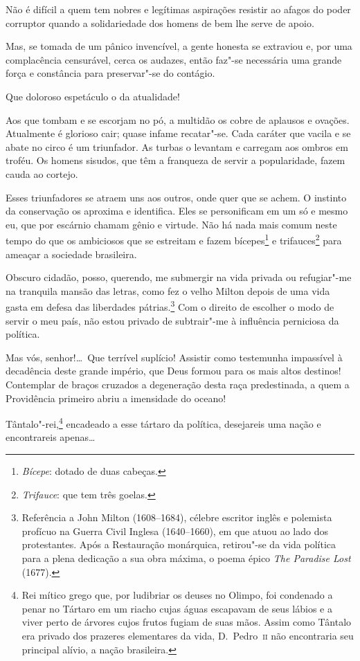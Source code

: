  Não é difícil a quem tem nobres e legítimas aspirações resistir ao
afagos do poder corruptor quando a solidariedade dos homens de bem lhe
serve de apoio. 

 Mas, se tomada de um pânico invencível, a gente honesta se extraviou e,
por uma complacência censurável, cerca os audazes, então faz"-se
necessária uma grande força e constância para preservar"-se do contágio. 

 Que doloroso espetáculo o da atualidade!

 Aos que tombam e se escorjam no pó, a multidão os cobre de aplausos e
ovações. Atualmente é glorioso cair; quase infame recatar"-se. Cada
caráter que vacila e se abate no circo é um triunfador. As turbas o
levantam e carregam aos ombros em troféu. Os homens sisudos, que têm a
franqueza de servir a popularidade, fazem cauda ao cortejo. 

 Esses triunfadores se atraem uns aos outros, onde quer que se achem. O
instinto da conservação os aproxima e identifica. Eles se personificam
em um só e mesmo eu, que por escárnio chamam gênio e virtude. Não há
nada mais comum neste tempo do que os ambiciosos que se estreitam e
fazem bícepes\footnote{ \textit{Bícepe}: dotado de duas cabeças.}
 e trifauces\footnote{ \textit{Trifauce}: que tem três goelas.}
 para ameaçar a sociedade brasileira. 

 Obscuro cidadão, posso, querendo, me submergir na vida privada ou
refugiar"-me na tranquila mansão das letras, como fez o velho Milton
depois de uma vida gasta em defesa das liberdades
pátrias.\footnote{ Referência a John Milton (1608--1684), célebre escritor inglês e
polemista profícuo na Guerra Civil Inglesa (1640--1660), em que atuou
ao lado dos protestantes. Após a Restauração monárquica, retirou"-se
da vida política para a plena dedicação a sua obra máxima, o poema
épico \textit{The Paradise Lost} (1677).}
 Com o direito de escolher o modo de servir o meu país, não estou
privado de subtrair"-me à influência perniciosa da política.

 Mas vós, senhor!\ldots\ Que terrível suplício! Assistir como testemunha
impassível à decadência deste grande império, que Deus formou para os
mais altos destinos! Contemplar de braços cruzados a degeneração desta
raça predestinada, a quem a Providência primeiro abriu a imensidade do oceano!

 Tântalo"-rei,\footnote{ Rei mítico grego que, por ludibriar os deuses no Olimpo, foi condenado
a penar no Tártaro em um riacho cujas águas escapavam de seus lábios e
a viver perto de árvores cujos frutos fugiam de suas mãos.  Assim como
Tântalo era privado dos prazeres elementares da vida, D.~Pedro~\textsc{ii} não
encontraria seu principal alívio, a nação brasileira.}
 encadeado a esse tártaro da política, desejareis uma nação e
encontrareis apenas\ldots

